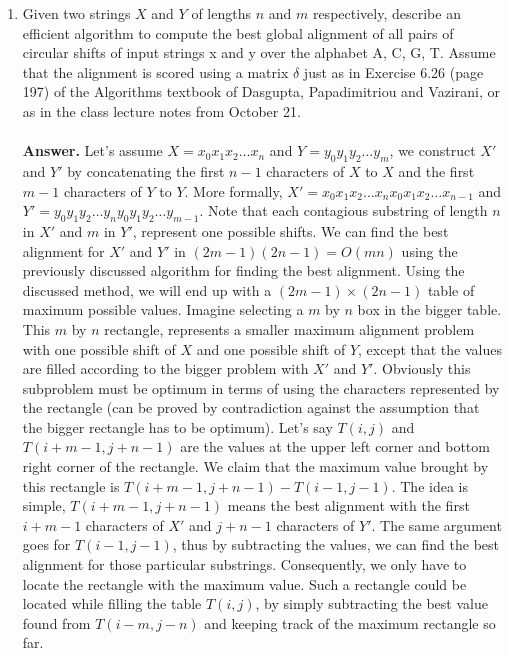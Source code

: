 \documentclass[letterpaper,12pt]{article}
\begin{document}
\begin{enumerate}
\item Given two strings $X$ and $Y$ of lengths $n$ and $m$ respectively, describe an efficient algorithm to compute the best global alignment of all pairs of circular shifts of input strings x and y over the alphabet {A, C, G, T}. Assume that the alignment is scored using a matrix $\delta$ just as in Exercise 6.26 (page 197) of the Algorithms textbook of Dasgupta, Papadimitriou and Vazirani, or as in the class lecture notes from October 21.\\\\
\textbf{Answer.} Let's assume $X = x_0x_1x_2\ldots x_n$ and $Y = y_0y_1y_2\ldots y_m$, we construct $X'$ and
$Y'$ by concatenating the first $n-1$ characters of $X$ to $X$ and the first $m-1$ characters of $Y$ to $Y$. More formally, $X'=x_0x_1x_2\ldots{}x_nx_0x_1x_2\ldots{}x_{n-1}$ and $Y'=y_0y_1y_2\ldots{}y_ny_0y_1y_2\ldots{}y_{m-1}$. Note that each contagious substring of length $n$ in $X'$ and $m$ in $Y'$, represent one possible shifts. We can find the best alignment for $X'$ and $Y'$ in $(2m-1)(2n-1)=O(mn)$ using the previously discussed algorithm for finding the best alignment. Using the discussed method, we will end up with a $(2m-1)\times(2n-1)$ table of maximum possible values. Imagine selecting a $m$ by $n$ box in the bigger table. This $m$ by $n$ rectangle, represents a smaller maximum alignment problem with one possible shift of $X$ and one possible shift of $Y$, except that the values are filled according to the bigger problem with $X'$ and $Y'$. Obviously this subproblem must be optimum in terms of using the characters represented by the rectangle (can be proved by contradiction against the assumption that the bigger rectangle has to be optimum). Let's say $T(i, j)$ and $T(i+m-1, j+n-1)$ are the values at the upper left corner and bottom right corner of the rectangle. We claim that the maximum value brought by this rectangle is $T(i+m-1, j+n-1) - T(i-1, j-1)$. The idea is simple, $T(i+m-1, j+n-1)$ means the best alignment with the first $i+m-1$ characters of $X'$ and $j+n-1$ characters of $Y'$. The same argument goes for $T(i-1, j-1)$, thus by subtracting the values, we can find the best alignment for those particular substrings. Consequently, we only have to locate the rectangle with the maximum value. Such a rectangle could be located while filling the table $T(i, j)$, by simply subtracting the best value found from $T(i-m, j-n)$ and keeping track of the maximum rectangle so far.

\end{enumerate}
\end{document}
